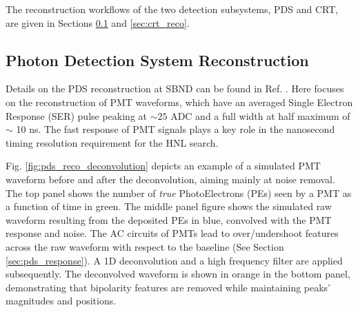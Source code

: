 The reconstruction workflows of the two detection subsystems, PDS and CRT, are given in Sections \ref{sec:reco_pds} and \ref{sec:crt_reco}. 

\subsection{Photon Detection System Reconstruction}
\label{sec:reco_pds}

Details on the PDS reconstruction at SBND can be found in Ref. \cite{sbnd_pds_paper}.
Here focuses on the reconstruction of PMT waveforms, which have an averaged Single Electron Response (SER) pulse peaking at $\sim 25$ ADC and a full width at half maximum of $\sim$ 10 ns.
The fast response of PMT signals plays a key role in the nanosecond timing resolution requirement for the HNL search.

Fig. \ref{fig:pds_reco_deconvolution} depicts an example of a simulated PMT waveform before and after the deconvolution, aiming mainly at noise removal.%
The top panel shows the number of \textit{true} PhotoElectrons (PEs) seen by a PMT as a function of time in green.
The middle panel figure shows the simulated raw waveform resulting from the deposited PEs in blue, convolved with the PMT response and noise.
The AC circuits of PMTs lead to over/undershoot features across the raw waveform with respect to the baseline (See Section \ref{sec:pds_response}).
A 1D deconvolution and a high frequency filter are applied subsequently.
The deconvolved waveform is shown in orange in the bottom panel, demonstrating that bipolarity features are removed while maintaining peaks' magnitudes and positions.

